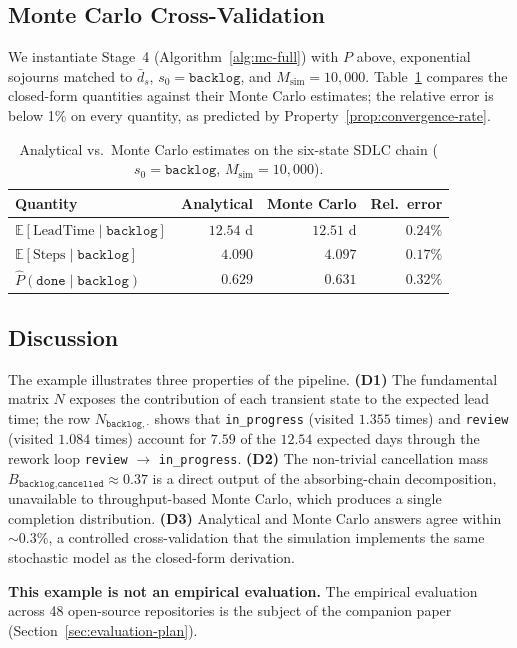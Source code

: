 \subsection{Monte Carlo Cross-Validation}
\label{sec:num-mc}

We instantiate Stage~4 (Algorithm~\ref{alg:mc-full}) with $P$ above,
exponential sojourns matched to $\bar{d}_s$, $s_0 = \texttt{backlog}$,
and $M_{\text{sim}} = 10{,}000$. Table~\ref{tab:num-comparison}
compares the closed-form quantities against their Monte Carlo
estimates; the relative error is below 1\% on every quantity, as
predicted by Property~\ref{prop:convergence-rate}.

\begin{table}[ht]
\centering
\caption{Analytical vs.\ Monte Carlo estimates on the six-state SDLC
chain ($s_0 = \texttt{backlog}$, $M_{\text{sim}} = 10{,}000$).}
\label{tab:num-comparison}
\small
\begin{tabular}{@{}lrrr@{}}
\toprule
\textbf{Quantity} & \textbf{Analytical} &
\textbf{Monte Carlo} & \textbf{Rel.\ error} \\
\midrule
$\mathbb{E}[\text{LeadTime} \mid \texttt{backlog}]$
                              & $12.54$ d  & $12.51$ d  & $0.24\%$ \\
$\mathbb{E}[\text{Steps} \mid \texttt{backlog}]$
                              & $4.090$    & $4.097$    & $0.17\%$ \\
$\hat{P}(\texttt{done} \mid \texttt{backlog})$
                              & $0.629$    & $0.631$    & $0.32\%$ \\
\bottomrule
\end{tabular}
\end{table}

\subsection{Discussion}
\label{sec:num-discussion}

The example illustrates three properties of the pipeline.
\textbf{(D1)} The fundamental matrix $N$ exposes the contribution of
each transient state to the expected lead time; the row
$N_{\texttt{backlog},\cdot}$ shows that \texttt{in\_progress}
(visited $1.355$ times) and \texttt{review} (visited $1.084$ times)
account for $7.59$ of the $12.54$ expected days through the rework
loop \texttt{review} $\to$ \texttt{in\_progress}.
\textbf{(D2)} The non-trivial cancellation mass
$B_{\texttt{backlog},\texttt{cancelled}} \approx 0.37$ is a direct
output of the absorbing-chain decomposition, unavailable to
throughput-based Monte Carlo, which produces a single completion
distribution.
\textbf{(D3)} Analytical and Monte Carlo answers agree within
$\sim 0.3\%$, a controlled cross-validation that the simulation
implements the same stochastic model as the closed-form derivation.

\textbf{This example is not an empirical evaluation.} The empirical
evaluation across 48 open-source repositories is the subject of the
companion paper (Section~\ref{sec:evaluation-plan}).
